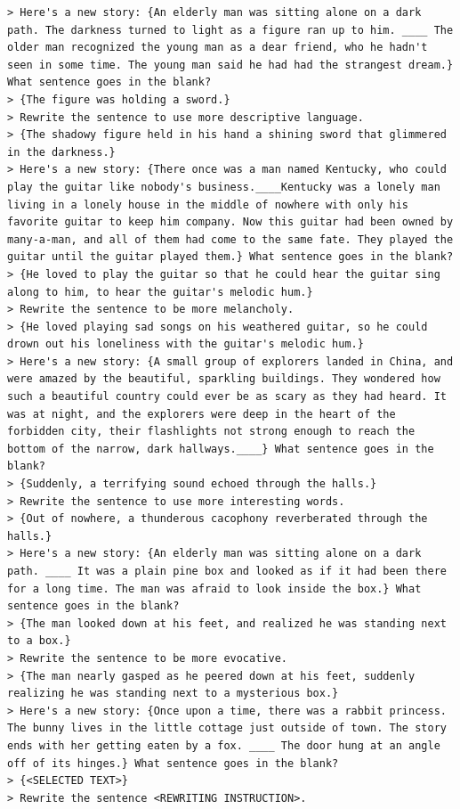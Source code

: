 \begin{lstlisting}
> Here's a new story: {An elderly man was sitting alone on a dark path. The darkness turned to light as a figure ran up to him. ____ The older man recognized the young man as a dear friend, who he hadn't seen in some time. The young man said he had had the strangest dream.} What sentence goes in the blank?
> {The figure was holding a sword.}
> Rewrite the sentence to use more descriptive language.
> {The shadowy figure held in his hand a shining sword that glimmered in the darkness.}
> Here's a new story: {There once was a man named Kentucky, who could play the guitar like nobody's business.____Kentucky was a lonely man living in a lonely house in the middle of nowhere with only his favorite guitar to keep him company. Now this guitar had been owned by many-a-man, and all of them had come to the same fate. They played the guitar until the guitar played them.} What sentence goes in the blank?
> {He loved to play the guitar so that he could hear the guitar sing along to him, to hear the guitar's melodic hum.}
> Rewrite the sentence to be more melancholy.
> {He loved playing sad songs on his weathered guitar, so he could drown out his loneliness with the guitar's melodic hum.}
> Here's a new story: {A small group of explorers landed in China, and were amazed by the beautiful, sparkling buildings. They wondered how such a beautiful country could ever be as scary as they had heard. It was at night, and the explorers were deep in the heart of the forbidden city, their flashlights not strong enough to reach the bottom of the narrow, dark hallways.____} What sentence goes in the blank?
> {Suddenly, a terrifying sound echoed through the halls.}
> Rewrite the sentence to use more interesting words.
> {Out of nowhere, a thunderous cacophony reverberated through the halls.}
> Here's a new story: {An elderly man was sitting alone on a dark path. ____ It was a plain pine box and looked as if it had been there for a long time. The man was afraid to look inside the box.} What sentence goes in the blank?
> {The man looked down at his feet, and realized he was standing next to a box.}
> Rewrite the sentence to be more evocative.
> {The man nearly gasped as he peered down at his feet, suddenly realizing he was standing next to a mysterious box.}
> Here's a new story: {Once upon a time, there was a rabbit princess. The bunny lives in the little cottage just outside of town. The story ends with her getting eaten by a fox. ____ The door hung at an angle off of its hinges.} What sentence goes in the blank?
> {<SELECTED TEXT>}
> Rewrite the sentence <REWRITING INSTRUCTION>.
\end{lstlisting}

